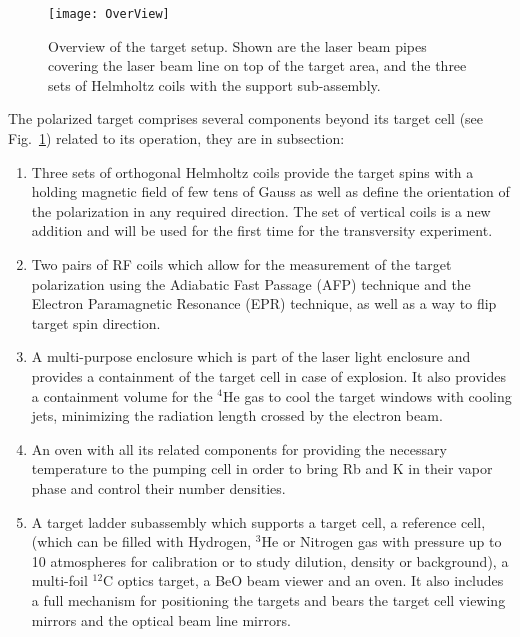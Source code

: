 \begin{figure}[p]
\begin{center}
\centerline{\texttt{[image: OverView]}}
\end{center}
\caption[Overview of the polarized $^3$He target setup]%
{Overview of the target setup. Shown are the laser
beam pipes covering the laser beam line on top of the target area,
and the three sets of Helmholtz coils with the support sub-assembly. }
\label{fig:overview}
\end{figure}

The polarized target comprises several
components beyond its target cell (see Fig.~\ref{fig:overview})
related to its operation, they are in subsection:

\begin{enumerate}

\item 
Three sets of orthogonal Helmholtz coils provide the target spins with a
holding magnetic field 
of few tens of Gauss as well as define the orientation of the
polarization in any required 
direction. The set of vertical coils
is a new addition and will be used for the first
time for the transversity experiment\cite{E06010}.

\item
Two pairs of RF coils which allow for the measurement of the target
polarization
using the Adiabatic Fast Passage (AFP) technique and the Electron
Paramagnetic 
Resonance (EPR) technique, as well as a way to flip target spin direction.

\item
A multi-purpose enclosure which is part of the laser light enclosure and
provides a
containment of the target cell in case of explosion. It also provides a
containment volume for the
$^4$He gas to cool the target windows with cooling jets, minimizing the
radiation length crossed  by the electron beam. 

\item 
An oven with all its related components for providing the necessary
temperature to the  pumping cell in order to bring Rb and K
in their vapor phase 
and control their number densities. 

\item 
A target ladder subassembly which supports a target cell,  a reference
cell, (which can be filled with Hydrogen, $^3$He or Nitrogen gas 
with pressure
up to 10 atmospheres for calibration or to study dilution, density or 
background), a multi-foil $^{12}$C optics target, a
BeO beam viewer and an oven. It also includes a full mechanism
for positioning the targets 
and bears the target cell viewing mirrors and the optical beam line
mirrors. 


\end{enumerate}
